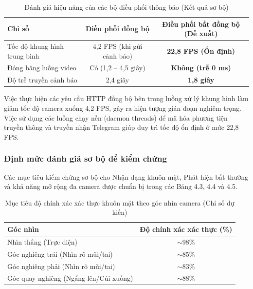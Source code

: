 \documentclass[12pt,a4paper]{article}
\begin{document}
\begin{table}[h]
    \centering
    \caption{Đánh giá hiệu năng của các bộ điều phối thông báo (Kết quả sơ bộ)}
    \label{tab:latency_results}
    \begin{tabular}{lcc}
        \toprule
        \textbf{Chỉ số} & \textbf{Điều phối đồng bộ} & \textbf{Điều phối bất đồng bộ (Đề xuất)} \\
        \midrule
        Tốc độ khung hình trung bình & 4,2 FPS (khi gửi cảnh báo) & \textbf{22,8 FPS (Ổn định)} \\
        Đóng băng luồng video & Có (1,2 -- 4,5 giây) & \textbf{Không (trễ 0 ms)} \\
        Độ trễ truyền cảnh báo & 2,4 giây & \textbf{1,8 giây} \\
        \bottomrule
    \end{tabular}
\end{table}

Việc thực hiện các yêu cầu HTTP đồng bộ bên trong luồng xử lý khung hình làm giảm tốc độ camera xuống 4,2 FPS, gây ra hiện tượng gián đoạn nghiêm trọng. Việc sử dụng các luồng chạy nền (daemon threads) để mã hóa phương tiện truyền thông và truyền nhận Telegram giúp duy trì tốc độ ổn định ở mức 22,8 FPS.

\subsubsection{Định mức đánh giá sơ bộ để kiểm chứng}
Các mục tiêu kiểm chứng sơ bộ cho Nhận dạng khuôn mặt, Phát hiện bất thường và khả năng mở rộng đa camera được chuẩn bị trong các Bảng 4.3, 4.4 và 4.5.

\begin{table}[h]
    \centering
    \caption{Mục tiêu độ chính xác xác thực khuôn mặt theo góc nhìn camera (Chỉ số dự kiến)}
    \label{tab:face_bench}
    \begin{tabular}{lc}
        \toprule
        \textbf{Góc nhìn} & \textbf{Độ chính xác xác thực (\%)} \\
        \midrule
        Nhìn thẳng (Trực diện) & $\sim$98\% \\
        Góc nghiêng trái (Nhìn rõ mũi/tai) & $\sim$85\% \\
        Góc nghiêng phải (Nhìn rõ mũi/tai) & $\sim$83\% \\
        Góc quay nghiêng (Ngẩng lên/Cúi xuống) & $\sim$88\% \\
        \bottomrule
    \end{tabular}
\end{table}
\end{document}
